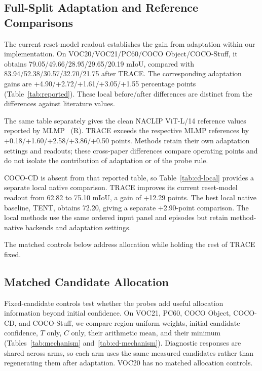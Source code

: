 \documentclass[letterpaper]{article}
\begin{document}
\subsection{Full-Split Adaptation and Reference Comparisons}
The current reset-model readout establishes the gain from adaptation within our implementation. On VOC20/VOC21/PC60/COCO Object/COCO-Stuff, it obtains 79.05/49.66/28.95/29.65/20.19 mIoU, compared with 83.94/52.38/30.57/32.70/21.75 after TRACE. The corresponding adaptation gains are +4.90/+2.72/+1.61/+3.05/+1.55 percentage points (Table~\ref{tab:reported}). These local before/after differences are distinct from the differences against literature values.

The same table separately gives the clean NACLIP ViT-L/14 reference values reported by MLMP~\cite{noori2025mlmp} (R). TRACE exceeds the respective MLMP references by +0.18/+1.60/+2.58/+3.86/+0.50 points. Methods retain their own adaptation settings and readouts; these cross-paper differences compare operating points and do not isolate the contribution of adaptation or of the probe rule.



COCO-CD is absent from that reported table, so Table~\ref{tab:cd-local} provides a separate local native comparison. TRACE improves its current reset-model readout from 62.82 to 75.10 mIoU, a gain of +12.29 points. The best local native baseline, TENT, obtains 72.20, giving a separate +2.90-point comparison. The local methods use the same ordered input panel and episodes but retain method-native backends and adaptation settings.



The matched controls below address allocation while holding the rest of TRACE fixed.

\subsection{Matched Candidate Allocation}
\label{sec:mechanism}
Fixed-candidate controls test whether the probes add useful allocation information beyond initial confidence. On VOC21, PC60, COCO Object, COCO-CD, and COCO-Stuff, we compare region-uniform weights, initial candidate confidence, $T$ only, $C$ only, their arithmetic mean, and their minimum (Tables~\ref{tab:mechanism} and~\ref{tab:cd-mechanism}). Diagnostic responses are shared across arms, so each arm uses the same measured candidates rather than regenerating them after adaptation. VOC20 has no matched allocation controls.
\end{document}
